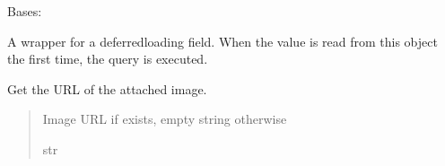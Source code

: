 \documentclass[letterpaper,10pt,english]{sphinxmanual}
\begin{document}
\begin{fulllineitems}
\begin{fulllineitems}
\label{\detokenize{pages_app.models:pages_app.models.Block.MultipleObjectsReturned}}
\pysigstartsignatures
\pysigline
{}
\pysigstopsignatures
\sphinxAtStartPar
Bases: 

\end{fulllineitems}


\begin{fulllineitems}
\label{\detokenize{pages_app.models:pages_app.models.Block.created_at}}
\pysigstartsignatures
\pysigline
{}
\pysigstopsignatures
\sphinxAtStartPar
A wrapper for a deferred\sphinxhyphen{}loading field. When the value is read from this
object the first time, the query is executed.

\end{fulllineitems}


\begin{fulllineitems}
\label{\detokenize{pages_app.models:pages_app.models.Block.get_image_url}}
\pysigstartsignatures
\pysiglinewithargsret
{}
{}
{}
\pysigstopsignatures
\sphinxAtStartPar
Get the URL of the attached image.
\begin{quote}\begin{description}
\sphinxAtStartPar
Image URL if exists, empty string otherwise

\sphinxAtStartPar
str

\end{description}\end{quote}

\end{fulllineitems}


\begin{fulllineitems}
\label{\detokenize{pages_app.models:pages_app.models.Block.get_next_by_created_at}}
\pysigstartsignatures
\pysiglinewithargsret
{}
{\sphinxparamcomma {}\sphinxparamcomma {}\sphinxparamcomma {}}
{}
\pysigstopsignatures
\end{fulllineitems}


\end{fulllineitems}
\end{document}
